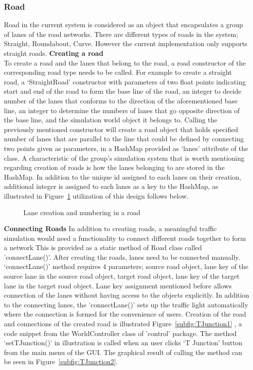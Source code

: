 \documentclass[11pt]{article}
\begin{document}
\subsubsection{Road}
Road in the current system is considered as an object that encapsulates a group of lanes of the road networks. There are different types of roads in the system; Straight, Roundabout, Curve. However the current implementation only supports straight roads. 
\textbf{Creating a road}\\
To create a road and the lanes that belong to the road, a road constructor of the corresponding road type needs to be called. For example to create a straight road, a ‘StraightRoad’ constructor with parameters of two float points indicating start and end of the road to form the base line of the road, an integer to decide number of the lanes that conforms to the direction of the aforementioned base line, an integer to determine the numbers of lanes that go opposite direction of the base line, and the simulation world object it belongs to. Calling the previously mentioned constructor will create a road object that holds specified number of lanes that are parallel to the line that could be defined by connecting two points given as parameters, in a HashMap provided as ‘lanes’ attribute of the class. A characteristic of the group’s simulation system that is worth mentioning regarding creation of roads is how the lanes belonging to are stored in the HashMap. In addition to the unique id assigned to each lanes on their creation, additional integer is assigned to each lanes as a key to the HashMap, as illustrated in Figure~\ref{fig:laneroadnumber} utilization of this design follows below.\\
\begin{figure}[!htb]
\centering
\setlength{\fboxsep}{0pt}%
\setlength{\fboxrule}{1pt}%
\caption{Lane creation and numbering in a road}
\label{fig:laneroadnumber}
\end{figure}
\textbf{Connecting Roads}
In addition to creating roads, a meaningful traffic simulation would need a functionality to connect different roads together to form a network This is provided as a static method of Road class called 'connectLane()'. After creating the roads, lanes need to be connected manually. ‘connectLane()’ method requires 4 parameters; source road object, lane key of the source lane in the source road object, target road object, lane key of the target lane in the target road object. Lane key assignment mentioned before allows connection of the lanes without having access to the objects explicitly. In addition to the connecting lanes, the 'connectLane()' sets up the traffic light automatically where the connection is formed for the convenience of users. Creation of the road and connections of the created road is illustrated Figure~\ref{subfig:TJunction1} , a code snippet from the WorldController class of 'control' package. The method `setTJunction()' in illustration is called when an user clicks `T Junction' button from the main menu of the GUI. The graphical result of calling the method can be seen in Figure~\ref{subfig:TJunction2}.
\end{document}
